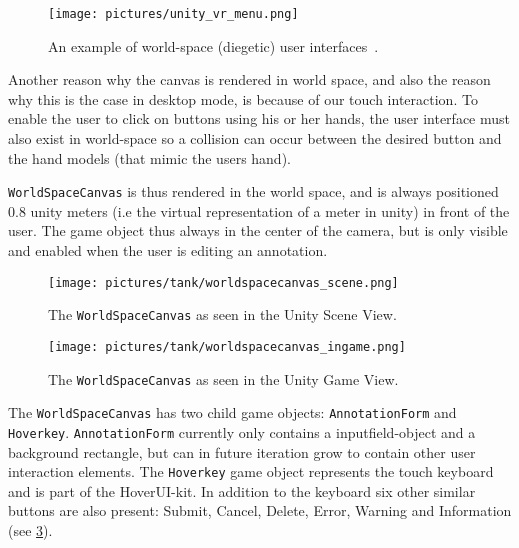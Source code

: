 \begin{figure}%
	\texttt{[image: pictures/unity\_vr\_menu.png]}
	\caption[An example of world-space (diegetic) user interfaces]{An example of world-space (diegetic) user interfaces~\citep{Unity}.}
	\label{fig:unity_vr_menu}
\end{figure} 

Another reason why the canvas is rendered in world space, and also the reason why this is the case in desktop mode, is because of our touch interaction.
To enable the user to click on buttons using his or her hands, the user interface must also exist in world-space so a collision can occur between the desired 
button and the hand models (that mimic the users hand). 

\texttt{WorldSpaceCanvas} is thus rendered in the world space, and is always positioned 0.8 unity meters (i.e the virtual representation of a meter in unity) 
in front of the user. The game object thus always in the center of the camera, but is only visible and enabled when the user is editing an annotation.

\begin{figure}%
	\texttt{[image: pictures/tank/worldspacecanvas\_scene.png]}
	\caption[The \texttt{WorldSpaceCanvas} as seen in the Unity Scene View]{The \texttt{WorldSpaceCanvas} as seen in the Unity Scene View.}
	\label{fig:worldspacecanvas_scene}
\end{figure} 

\begin{figure}%
	\texttt{[image: pictures/tank/worldspacecanvas\_ingame.png]}
	\caption[The \texttt{WorldSpaceCanvas} as seen in the Unity Game View]{The \texttt{WorldSpaceCanvas} as seen in the Unity Game View.}
	\label{fig:worldspacecanvas_ingame}
\end{figure} 

The \texttt{WorldSpaceCanvas} has two child game objects: \texttt{AnnotationForm} and \texttt{Hoverkey}. 
\texttt{AnnotationForm} currently only contains a inputfield-object and a background rectangle, but can in future iteration grow to 
contain other user interaction elements. The \texttt{Hoverkey} game object represents the touch keyboard and is part of the HoverUI-kit.
In addition to the keyboard six other similar buttons are also present: Submit, Cancel, Delete, Error, Warning and Information (see \ref{fig:worldspacecanvas_ingame}).

